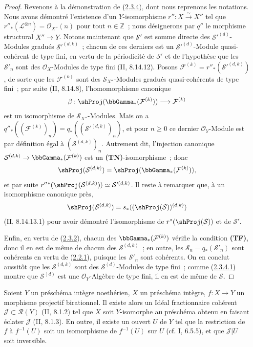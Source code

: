 \begin{proof}
Revenons à la démonstration de
(\hyperref[III.2.3.4-fr]{2.3.4}), dont nous reprenons les notations. Nous
avons démontré l'existence d'un $Y$-isomorphisme $r'':X\xrightarrow{\sim}X''$
tel que $r''_*(\mathcal L^{\otimes n})=\mathcal O_{X''}(n)$ pour tout
$n\in\mathbb Z$~; nous désignerons par $q''$ le morphisme structural
$X''\to Y$. Notons maintenant que $\mathcal S'$ est somme directe des
$\mathcal S'^{(d)}$-Modules gradués $\mathcal S'^{(d,k)}$~; chacun de ces
derniers est un $\mathcal S'^{(d)}$-Module quasi-cohérent de type fini, en
vertu de la périodicité de $\mathcal S'$ et de l'hypothèse que les
$\mathcal S'_n$ sont des $\mathcal O_X$-Modules de type fini
(II, 8.14.12). Posons
$\mathcal F^{(k)}=r''_*(\mathcal S'^{(d,k)})$, de sorte que les
$\mathcal F^{(k)}$ sont des $\mathcal S_{X''}$-Modules gradués
quasi-cohérents de type fini~; par suite (II, 8.14.8), l'homomorphisme
canonique
\[
\beta:\shProj(\bbGamma_*(\mathcal F^{(k)}))
\longrightarrow\mathcal F^{(k)}
\]
est un isomorphisme de $\mathcal S_{X''}$-Modules. Mais on a
$q''_*((\mathcal F^{(k)})_n)=q_*((\mathcal S'^{(d,k)})_n)$, et pour
$n\geq0$ ce dernier $\mathcal O_Y$-Module est par définition égal à
$(\mathcal S^{(d,k)})_n$. Autrement dit, l'injection canonique
$\mathcal S^{(d,k)}\to\bbGamma_*(\mathcal F^{(k)})$ est un
\textbf{(TN)}-isomorphisme~; donc
\[
\shProj(\mathcal S^{(d,k)})
=\shProj(\bbGamma_*(\mathcal F^{(k)})),
\]
et par suite
$r''{}^*(\shProj(\mathcal S^{(d,k)}))\simeq\mathcal S'^{(d,k)}$.
Il reste à remarquer que, à un isomorphisme canonique près,
\[
\shProj(\mathcal S^{(d,k)})
=s_*((\shProj(\mathcal S))^{(d,k)})
\]
(II, 8.14.13.1) pour avoir démontré l'isomorphisme de
$r^*(\shProj(\mathcal S))$ et de $\mathcal S'$.

Enfin, en vertu de (\hyperref[III.2.3.2-fr]{2.3.2}), chacun des
$\bbGamma_*(\mathcal F^{(k)})$ vérifie la condition \textbf{(TF)}, donc il
en est de même de chacun des $\mathcal S^{(d,k)}$~; en outre, les
$\mathcal S_n=q_*(\mathcal S'_n)$ sont cohérents en vertu de
(\hyperref[III.2.2.1-fr]{2.2.1}), puisque les $\mathcal S'_n$ sont
cohérents. On en conclut aussitôt que les $\mathcal S^{(d,k)}$ sont des
$\mathcal S^{(d)}$-Modules de type fini~; comme
(\hyperref[III.2.3.4.1-fr]{2.3.4.1}) montre que $\mathcal S^{(d)}$ est une
$\mathcal O_Y$-Algèbre de type fini, il en est de même de $\mathcal S$.
\end{proof}

\begin{proposition}[2.3.5]
\label{III.2.3.5-fr}
Soient $Y$ un préschéma intègre noethérien, $X$ un préschéma intègre,
$f:X\to Y$ un morphisme projectif birationnel. Il existe alors un Idéal
fractionnaire cohérent $\mathcal J\subset\mathcal R(Y)$ (II, 8.1.2) tel
que $X$ soit $Y$-isomorphe au préschéma obtenu en faisant éclater
$\mathcal J$ (II, 8.1.3). En outre, il existe un ouvert $U$ de $Y$ tel que
la restriction de $f$ à $f^{-1}(U)$ soit un isomorphisme de $f^{-1}(U)$
sur $U$ (cf. I, 6.5.5), et que $\mathcal J|U$ soit inversible.
\end{proposition}

